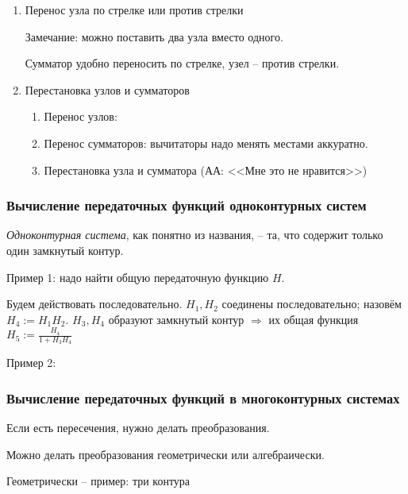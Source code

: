 \documentclass[main.tex]{subfiles}
\begin{document}
\begin{enumerate}[noitemsep]
    \item Перенос узла по стрелке или против стрелки


    Замечание: можно поставить два узла вместо одного.

    Сумматор удобно переносить по стрелке, узел -- против стрелки.

    \item Перестановка узлов и сумматоров

     \begin{enumerate}[noitemsep]
        \item Перенос узлов:
        \item Перенос сумматоров:
        вычитаторы надо менять местами аккуратно.

        \item Перестановка узла и сумматора (АА: <<Мне это не нравится>>)
    \end{enumerate}
\end{enumerate}

\subsubsection{Вычисление передаточных функций одноконтурных систем}

\emph{Одноконтурная система}, как понятно из названия, -- та, что содержит только один замкнутый контур.


Пример 1: надо найти общую передаточную функцию $ H $.

Будем действовать последовательно.
$ H_1, H_2 $ соединены последовательно; назовём $ H_4 := H_1 H_2 $.
$ H_3, H_4 $ образуют замкнутый контур $ \Rightarrow $ их общая функция $ H_5 := \frac{H_4}{1 + H_3 H_4} $

Пример 2:


\subsubsection{Вычисление передаточных функций в многоконтурных системах}

Если есть пересечения, нужно делать преобразования.

Можно делать преобразования геометрически или алгебраически.

Геометрически -- пример: три контура
\end{document}
